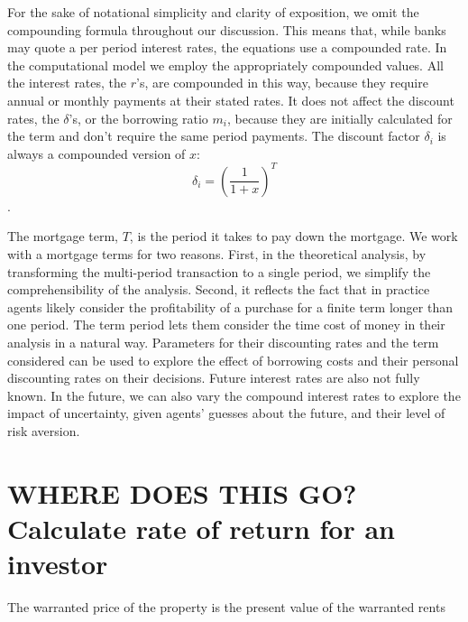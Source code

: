 For the sake of notational simplicity and clarity of exposition,  we omit the compounding formula throughout our discussion. This means that, while banks may quote a per period interest rates, the equations use a compounded rate. In the computational model we employ the appropriately compounded values. All %
 the interest rates, the $r$'s, are compounded in this way, because they require annual or monthly payments at their stated rates.
 It does not affect the discount rates, the $\delta$'s, or the borrowing ratio $m_i$, because they are initially calculated for the term and don't require the same period payments.
 The discount factor $\delta_i$ is always a compounded version of $x$:
 \[\delta_i=\left(\frac{1}{1+x}\right)^T\].

The {mortgage term}, $T$, is the period it takes to pay down the mortgage. We work with a mortgage terms for two reasons. First, in the theoretical analysis, by transforming the multi-period transaction to a single period, we simplify the comprehensibility of the analysis. Second, it reflects the fact that in practice agents  likely consider the profitability of a purchase for a finite term longer than one period. The term period lets them consider the time cost of money in their analysis in a natural way. Parameters for their discounting rates and the term considered can be used to explore the effect of borrowing costs and their personal discounting rates on their decisions. Future interest rates are also not fully known. In the future, we can also vary the compound interest rates to explore the impact of uncertainty, given agents' guesses about the future, and their level of risk aversion.


\section{WHERE DOES THIS GO? Calculate rate of return for an investor}

 The warranted price of the property is the present value of the \gls{warranted rents}%

